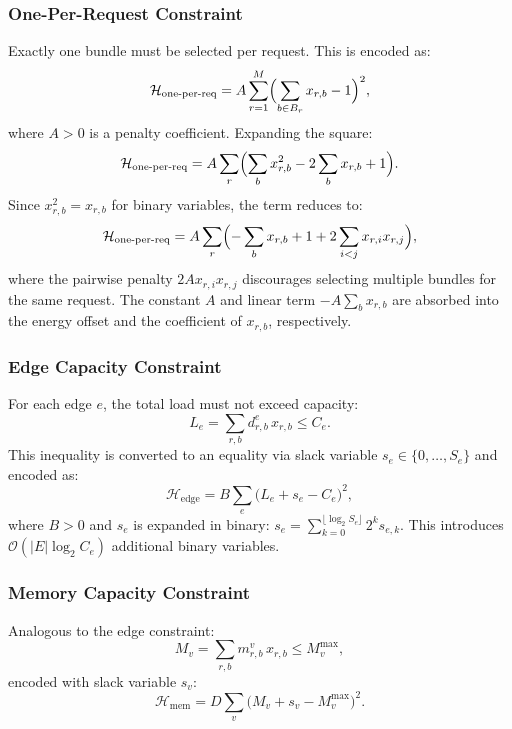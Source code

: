 \documentclass[10pt,a4paper]{article}
\newcommand{\calH}{\mathcal{H}}
\begin{document}
\subsubsection{One-Per-Request Constraint}
Exactly one bundle must be selected per request.  This is encoded as:
\begin{equation}
  \calH_{\text{one-per-req}} = A \sum_{r=1}^M
    \Bigl(\sum_{b \in B_r} x_{r,b} - 1\Bigr)^2,
\end{equation}
where $A > 0$ is a penalty coefficient.  Expanding the square:
\begin{equation}
  \calH_{\text{one-per-req}} = A \sum_r \Bigl(
    \sum_b x_{r,b}^2 - 2\sum_b x_{r,b} + 1\Bigr).
\end{equation}
Since $x_{r,b}^2 = x_{r,b}$ for binary variables, the term reduces to:
\begin{equation}
  \calH_{\text{one-per-req}} = A \sum_r \Bigl(
    -\sum_b x_{r,b} + 1 + 2\sum_{i<j} x_{r,i} x_{r,j}\Bigr),
\end{equation}
where the pairwise penalty $2A x_{r,i} x_{r,j}$ discourages selecting
multiple bundles for the same request.  The constant $A$ and linear
term $-A\sum_b x_{r,b}$ are absorbed into the energy offset and the
coefficient of $x_{r,b}$, respectively.

\subsubsection{Edge Capacity Constraint}
For each edge $e$, the total load must not exceed capacity:
\begin{equation}
  L_e = \sum_{r,b} d_{r,b}^e \, x_{r,b} \leq C_e.
\end{equation}
This inequality is converted to an equality via slack variable
$s_e \in \{0, \dots, S_e\}$ and encoded as:
\begin{equation}
  \calH_{\text{edge}} = B \sum_e \bigl(L_e + s_e - C_e\bigr)^2,
\end{equation}
where $B > 0$ and $s_e$ is expanded in binary:
$s_e = \sum_{k=0}^{\lfloor \log_2 S_e\rfloor} 2^k s_{e,k}$.
This introduces $\mathcal{O}(|E| \log_2 C_e)$ additional binary
variables.

\subsubsection{Memory Capacity Constraint}
Analogous to the edge constraint:
\begin{equation}
  M_v = \sum_{r,b} m_{r,b}^v \, x_{r,b} \leq M_v^{\max},
\end{equation}
encoded with slack variable $s_v$:
\begin{equation}
  \calH_{\text{mem}} = D \sum_v \bigl(M_v + s_v - M_v^{\max}\bigr)^2.
\end{equation}
\end{document}
